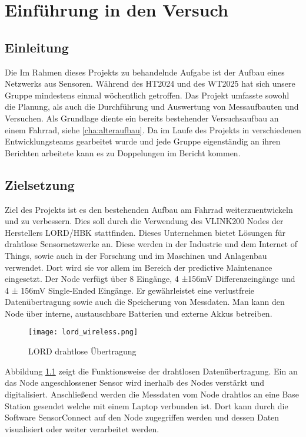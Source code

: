 \chapter{Einführung in den Versuch}
\label{cha:einfuehrung}
\todo{}
\section{Einleitung}

Die Im Rahmen dieses Projekts zu behandelnde Aufgabe ist der Aufbau eines Netzwerks aus Sensoren.
Während des HT2024 und des WT2025 hat sich unsere Gruppe mindestens einmal wöchentlich getroffen.
Das Projekt umfasste sowohl die Planung, als auch die Durchführung und Auswertung von Messaufbauten und Versuchen.
Als Grundlage diente ein bereits bestehender Versuchsaufbau an einem Fahrrad, siehe \ref{cha:alteraufbau}.
Da im Laufe des Projekts in verschiedenen Entwicklungsteams gearbeitet wurde und jede Gruppe eigenständig an ihren Berichten arbeitete kann es zu Doppelungen im Bericht kommen.

\section{Zielsetzung}
Ziel des Projekts ist es den bestehenden Aufbau am Fahrrad weiterzuentwickeln und zu verbessern.
Dies soll durch die Verwendung des VLINK200 Nodes der Herstellers LORD/HBK stattfinden.
Dieses Unternehmen bietet Lösungen für drahtlose Sensornetzwerke an. Diese werden in der Industrie und dem Internet of Things, sowie auch in der Forschung und im Maschinen und Anlagenbau verwendet.
Dort wird sie vor allem im Bereich der predictive Maintenance eingesetzt.
Der Node verfügt über 8 Eingänge, 4 ±156mV Differenzeingänge und 4 ± 156mV Single-Ended Eingänge.
Er gewährleistet eine verlustfreie Datenübertragung sowie auch die Speicherung von Messdaten.
Man kann den Node über interne, austauschbare Batterien und externe Akkus betreiben.

\begin{figure}[h]
    \begin{center}
        \texttt{[image: lord\_wireless.png]}
        \caption[LORD drahtlose Übertragung (Abbildungsverzeichnis)]{LORD drahtlose Übertragung
        \cite{VLInkManual}
        }
        \label{fig:lordwireless}
    \end{center}
\end{figure}

Abbildung \ref{fig:lordwireless} zeigt die Funktionsweise der drahtlosen Datenübertragung.
Ein an das Node angeschlossener Sensor wird inerhalb des Nodes verstärkt und digitalisiert.
Anschließend werden die Messdaten vom Node drahtlos an eine Base Station gesendet welche mit einem Laptop verbunden ist.
Dort kann durch die Software SensorConnect auf den Node zugegriffen werden und dessen Daten visualisiert oder weiter verarbeitet werden.


